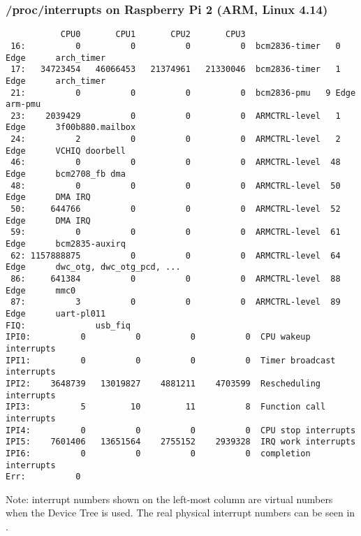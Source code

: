 \begin{frame}[fragile]
  \frametitle{/proc/interrupts on Raspberry Pi 2 (ARM, Linux 4.14)}
\begin{block}{}
  \tiny
\begin{verbatim}
           CPU0       CPU1       CPU2       CPU3       
 16:          0          0          0          0  bcm2836-timer   0 Edge      arch_timer
 17:   34723454   46066453   21374961   21330046  bcm2836-timer   1 Edge      arch_timer
 21:          0          0          0          0  bcm2836-pmu   9 Edge      arm-pmu
 23:    2039429          0          0          0  ARMCTRL-level   1 Edge      3f00b880.mailbox
 24:          2          0          0          0  ARMCTRL-level   2 Edge      VCHIQ doorbell
 46:          0          0          0          0  ARMCTRL-level  48 Edge      bcm2708_fb dma
 48:          0          0          0          0  ARMCTRL-level  50 Edge      DMA IRQ
 50:     644766          0          0          0  ARMCTRL-level  52 Edge      DMA IRQ
 59:          0          0          0          0  ARMCTRL-level  61 Edge      bcm2835-auxirq
 62: 1157888875          0          0          0  ARMCTRL-level  64 Edge      dwc_otg, dwc_otg_pcd, ...
 86:     641384          0          0          0  ARMCTRL-level  88 Edge      mmc0
 87:          3          0          0          0  ARMCTRL-level  89 Edge      uart-pl011
FIQ:              usb_fiq
IPI0:          0          0          0          0  CPU wakeup interrupts
IPI1:          0          0          0          0  Timer broadcast interrupts
IPI2:    3648739   13019827    4881211    4703599  Rescheduling interrupts
IPI3:          5         10         11          8  Function call interrupts
IPI4:          0          0          0          0  CPU stop interrupts
IPI5:    7601406   13651564    2755152    2939328  IRQ work interrupts
IPI6:          0          0          0          0  completion interrupts
Err:          0
\end{verbatim}
\end{block}
  \footnotesize
  Note: interrupt numbers shown on the left-most column are virtual
  numbers when the Device Tree is used. The real physical interrupt
  numbers can be seen in .
\end{frame}

